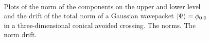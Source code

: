 \begin{figure}
  \centering
   \\
  \caption[Norms of a wavepacket in a three-dimensional conical avoided crossing]{
    Plots of the norm of the components on the upper and lower level and the drift of the total norm
    of a Gaussian wavepacket $\Ket{\Psi} = \phi_{0,0}$ in a three-dimensional conical avoided crossing.
     The norms.
     The norm drift.
    \label{fig:ca3d_norms_plots}
  }
\end{figure}

